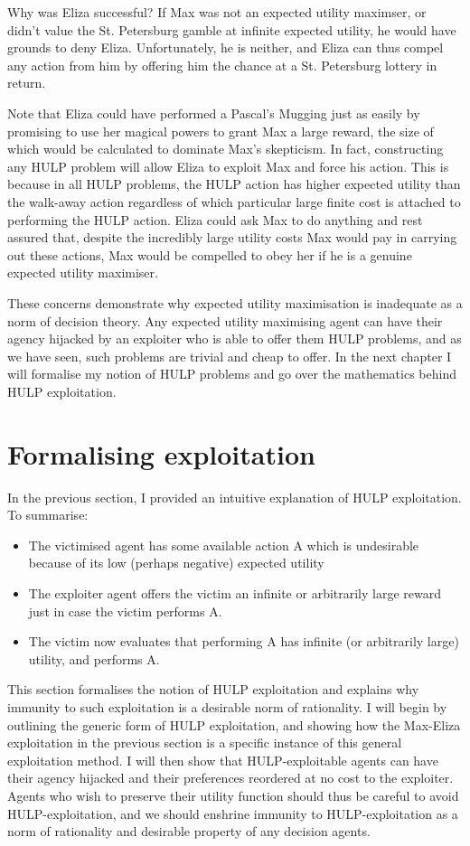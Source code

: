 \documentclass{article}
\begin{document}
Why was Eliza successful? If Max was not an expected utility maximser, or didn't value the St. Petersburg gamble at infinite expected utility, he would have grounds to deny Eliza. Unfortunately, he is neither, and Eliza can thus compel any action from him by offering him the chance at a St. Petersburg lottery in return. 

Note that Eliza could have performed a Pascal's Mugging just as easily by promising to use her magical powers to grant Max a large reward, the size of which would be calculated to dominate Max's skepticism. In fact, constructing any HULP problem will allow Eliza to exploit Max and force his action. This is because in all HULP problems, the HULP action has higher expected utility than the walk-away action regardless of which particular large finite cost is attached to performing the HULP action. Eliza could ask Max to do anything and rest assured that, despite the incredibly large utility costs Max would pay in carrying out these actions, Max would be compelled to obey her if he is a genuine expected utility maximiser.

These concerns demonstrate why expected utility maximisation is inadequate as a norm of decision theory. Any expected utility maximising agent can have their agency hijacked by an exploiter who is able to offer them HULP problems, and as we have seen, such problems are trivial and cheap to offer. In the next chapter I will formalise my notion of HULP problems and go over the mathematics behind HULP exploitation.

\section{Formalising exploitation}

In the previous section, I provided an intuitive explanation of HULP exploitation. To summarise:

\begin{itemize}
\item The victimised agent has some available action A which is undesirable because of its low (perhaps negative) expected utility
\item The exploiter agent offers the victim an infinite or arbitrarily large reward just in case the victim performs A. 
\item The victim now evaluates that performing A has infinite (or arbitrarily large) utility, and performs A.
\end{itemize}

This section formalises the notion of HULP exploitation and explains why immunity to such exploitation is a desirable norm of rationality. I will begin by outlining the generic form of HULP exploitation, and showing how the Max-Eliza exploitation in the previous section is a specific instance of this general exploitation method. I will then show that HULP-exploitable agents can have their agency hijacked and their preferences reordered at no cost to the exploiter. Agents who wish to preserve their utility function should thus be careful to avoid HULP-exploitation, and we should enshrine immunity to HULP-exploitation as a norm of rationality and desirable property of any decision agents.
\end{document}
